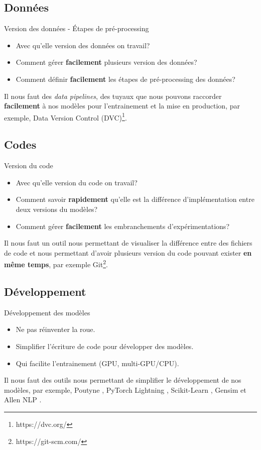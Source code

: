 \documentclass{beamer}
\begin{document}
	\subsection{Données}
	\begin{frame}{Version des données - Étapes de pré-processing}
		\begin{itemize}
			\item Avec qu'elle version des données on travail?
			\item Comment gérer \textbf{facilement} plusieurs version des données?
			\item Comment définir \textbf{facilement} les étapes de pré-processing des données?
		\end{itemize}
		Il nous faut des \textit{data pipelines}, des tuyaux que nous pouvons raccorder \textbf{facilement} à nos modèles pour l'entrainement et la mise en production, par exemple, Data Version Control (DVC)\footnote{https://dvc.org/}.
	\end{frame}

	\subsection{Codes}
	\begin{frame}{Version du code}
		\begin{itemize}
			\item Avec qu'elle version du code on travail?
			\item Comment savoir \textbf{rapidement} qu'elle est la différence d'implémentation entre deux versions du modèles?
			\item Comment gérer \textbf{facilement} les embranchements d'expérimentations?
		\end{itemize}
		Il nous faut un outil nous permettant de visualiser la différence entre des fichiers de code et nous permettant d'avoir plusieurs version du code pouvant exister \textbf{en même temps}, par exemple Git\footnote{https://git-scm.com/}.
	\end{frame}

	\subsection{Développement}
	\begin{frame}{Développement des modèles}
		\begin{itemize}
			\item Ne pas réinventer la roue.
			\item Simplifier l'écriture de code pour développer des modèles.
			\item Qui facilite l'entrainement (GPU, multi-GPU/CPU).
		\end{itemize}
		Il nous faut des outils nous permettant de simplifier le développement de nos modèles, par exemple, Poutyne \cite{poutyne}, PyTorch Lightning \cite{falcon2019pytorch}, Scikit-Learn \cite{sklearn_api}, Gensim \cite{rehurek_lrec} et Allen NLP \cite{Gardner2017AllenNLP}.
	\end{frame}
\end{document}
